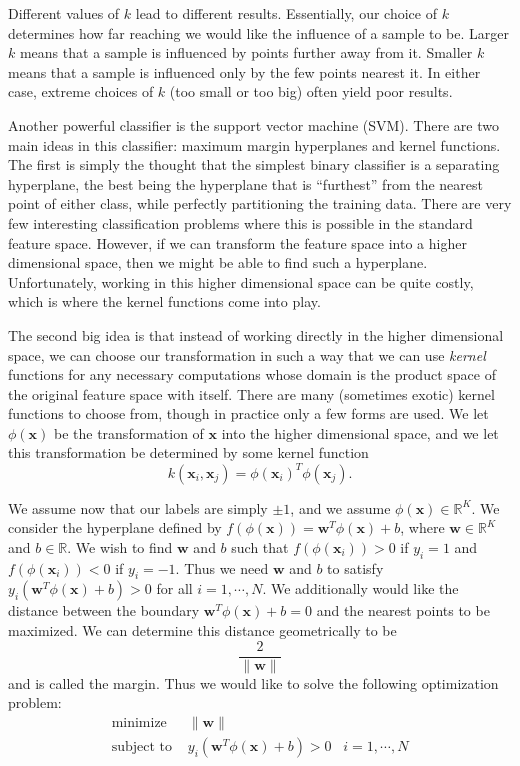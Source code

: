 Different values of $k$ lead to different results. Essentially, our choice of $k$ determines how far reaching we would like the influence of a sample to be. Larger $k$ means that a sample is influenced by points further away from it. Smaller $k$ means that a sample is influenced only by the few points nearest it. In either case, extreme choices of $k$ (too small or too big) often yield poor results.

Another powerful classifier is the support vector machine (SVM). There are two main ideas in this classifier: maximum margin hyperplanes and kernel functions. The first is simply the thought that the simplest binary classifier is a separating hyperplane, the best being the hyperplane that is ``furthest'' from the nearest point of either class, while perfectly partitioning the training data. There are very few interesting classification problems where this is possible in the standard feature space. However, if we can transform the feature space into a higher dimensional space, then we might be able to find such a hyperplane. Unfortunately, working in this higher dimensional space can be quite costly, which is where the kernel functions come into play.

The second big idea is that instead of working directly in the higher dimensional space, we can choose our transformation in such a way that we can use \emph{kernel} functions for any necessary computations whose domain is the product space of the original feature space with itself. There are many (sometimes exotic) kernel functions to choose from, though in practice only a few forms are used. We let $\phi(\mathbf{x})$ be the transformation of $\mathbf{x}$ into the higher dimensional space, and we let this transformation be determined by some kernel function $$k(\mathbf{x}_{i},\mathbf{x}_{j}) = \phi(\mathbf{x}_{i})^{T}\phi(\mathbf{x}_{j}).$$

We assume now that our labels are simply $\pm 1$, and we assume $\phi(\mathbf{x}) \in \mathbb{R}^{K}$. We consider the hyperplane defined by $f(\phi(\mathbf{x})) = \mathbf{w}^{T}\phi(\mathbf{x}) + b$, where $\mathbf{w} \in \mathbb{R}^{K}$ and $b \in \mathbb{R}$. We wish to find $\mathbf{w}$ and $b$ such that $f(\phi(\mathbf{x}_{i})) > 0$ if $y_{i} = 1$ and $f(\phi(\mathbf{x}_{i})) < 0$ if $y_{i} = -1$. Thus we need $\mathbf{w}$ and $b$ to satisfy $y_{i}\left( \mathbf{w}^{T}\phi(\mathbf{x}) + b\right) > 0$ for all $i = 1, \cdots, N$. We additionally would like the distance between the boundary $\mathbf{w}^{T}\phi(\mathbf{x}) + b = 0$ and the nearest points to be maximized. We can determine this distance geometrically to be $$\frac{2}{\|\mathbf{w}\|}$$ and is called the margin. Thus we would like to solve the following optimization problem:
\begin{align*}
\text{minimize } & \|\mathbf{w}\| \\
\text{subject to } & y_{i}\left(\mathbf{w}^{T}\phi(\mathbf{x}) + b\right) > 0 \; \; \; i = 1, \cdots, N
\end{align*} 

